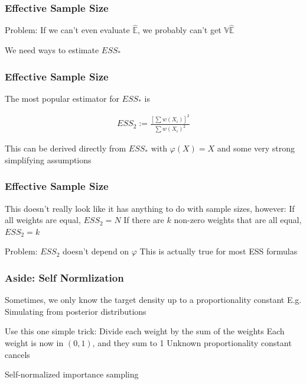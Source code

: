 \documentclass[14pt]{beamer}
\newcommand{\bE}{\mathbb{E}}
\newcommand{\bV}{\mathbb{V}}
\newcommand{\ess}{ESS_*}
\newcommand{\esst}{ESS_2}
\newcommand{\eh}{\hat{\bE}}
\begin{document}
\begin{frame}
    \frametitle{Effective Sample Size}

    \begin{outline}
        \1 Problem: If we can't even evaluate $\eh$, we probably can't get $\bV \eh$ \newline

        \1 We need ways to estimate $\ess$
    \end{outline}

\end{frame}



\begin{frame}
    \frametitle{Effective Sample Size}

    \begin{outline}
        \1 The most popular estimator for $\ess$ is
    \end{outline}
    \begin{gather*}
        \esst := \frac{[\sum w(X_i)]^2}{\sum w(X_i)^2}
    \end{gather*}
    \begin{outline}
        \1 This can be derived directly from $\ess$ with $\varphi(X) = X$ and some very strong simplifying assumptions
    \end{outline}
\end{frame}

\begin{frame}
    \frametitle{Effective Sample Size}

    \begin{outline}
        \1 This doesn't really look like it has anything to do with sample sizes, however:
        \2 If all weights are equal, $\esst = N$
        \2 If there are $k$ non-zero weights that are all equal, $\esst = k$ \newline

        \1 Problem: $\esst$ doesn't depend on $\varphi$
            \2 This is actually true for most ESS formulas
    \end{outline}
\end{frame}

\begin{frame}
    \frametitle{Aside: Self Normlization}

    \begin{outline}
        \1 Sometimes, we only know the target density up to a proportionality constant
            \2 E.g. Simulating from posterior distributions \newline

        \1 Use this one simple trick:
        \1 Divide each weight by the sum of the weights
            \2 Each weight is now in $(0,1)$, and they sum to 1
            \2 Unknown proportionality constant cancels \newline
        
        \1 Self-normalized importance sampling
    \end{outline}
\end{frame}
\end{document}
